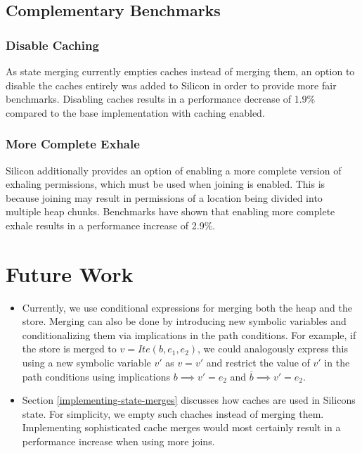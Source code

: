 \documentclass[11pt]{article}
\begin{document}
    \subsection{Complementary Benchmarks}

    \subsubsection{Disable Caching} \label{disable-caching}

    As state merging currently empties caches instead of merging them, an option to disable the caches
    entirely was added to Silicon in order to provide more fair benchmarks. Disabling caches results in a performance decrease of 1.9\%
    compared to the base implementation with caching enabled.

    \subsubsection{More Complete Exhale} \label{more-complete-exhale}

    Silicon additionally provides an option of enabling a more complete version of exhaling permissions,
    which must be used when joining is enabled. This is because joining may result in permissions of a 
    location being divided into multiple heap chunks. Benchmarks have shown that enabling more complete 
    exhale results in a performance increase of 2.9\%.

    \newpage
    \section{Future Work}

    \begin{itemize}
        \item Currently, we use conditional expressions for merging both
            the heap and the store. Merging can also be done by introducing
            new symbolic variables and conditionalizing them via implications
            in the path conditions. For example, if the store is merged to
            $v = Ite(b, e_1, e_2)$, we could analogously express this using
            a new symbolic variable $v'$ as
            $v = v'$ and restrict the value of $v'$ in the path conditions using implications
            $b \implies v' = e_2$ and $\overline{b} \implies v' = e_2$.
        \item Section \ref{implementing-state-merges} discusses how caches are
            used in Silicons state. For simplicity, we empty such chaches
            instead of merging them. Implementing sophisticated cache merges would most
            certainly result in a performance increase when using more joins.
    \end{itemize}

    \newpage
    \printbibliography
    
\end{document}
